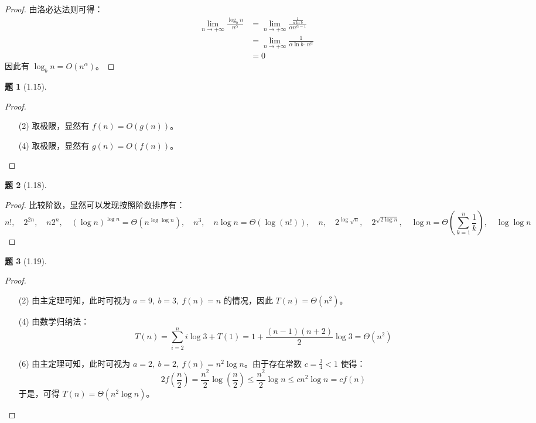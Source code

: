 \documentclass[11pt, a4paper]{article}
\newtheorem{problem}{题}
\begin{document}
\begin{proof}
    由洛必达法则可得：
    \begin{align*}
        \lim_{n \to +\infty} \frac{\log_{b}n}{n^{\alpha}}
         & = \lim_{n \to +\infty} \frac{\frac{1}{n \ln b}}{\alpha n^{\alpha-1}} \\
         & = \lim_{n \to +\infty} \frac{1}{\alpha \ln b \cdot n^{\alpha}}       \\
         & = 0
    \end{align*}
    因此有 $\log_{b}n = O(n^{\alpha})$。
\end{proof}

\vspace{1em}

\begin{problem}[1.15]
\end{problem}

\begin{proof}
    \leavevmode
    \begin{enumerate}
        \item[(2)] 取极限，显然有 $f(n) = O(g(n))$。
        \item[(4)] 取极限，显然有 $g(n) = O(f(n))$。
    \end{enumerate}
\end{proof}

\vspace{1em}

\begin{problem}[1.18]
\end{problem}

\begin{proof}
    比较阶数，显然可以发现按照阶数排序有：
    \[ n!, \quad 2^{2n}, \quad n 2^{n}, \quad (\log n)^{\log n} = \Theta(n^{\log \log n}), \quad n^3, \quad n \log n = \Theta(\log(n!)), \quad n, \quad 2^{\log \sqrt{n}}, \quad 2^{\sqrt{2 \log n}}, \quad \log n = \Theta\left(\sum_{k=1}^{n}\frac{1}{k}\right), \quad \log \log n \]
\end{proof}

\vspace{1em}

\begin{problem}[1.19]
\end{problem}

\begin{proof}
    \leavevmode
    \begin{enumerate}
        \item[(2)] 由主定理可知，此时可视为 $a=9, \ b=3, \ f(n)=n$ 的情况，因此 $T(n) = \Theta(n^2)$。
        \item[(4)] 由数学归纳法：
              \[ T(n) = \sum_{i=2}^{n} i \log 3 + T(1) = 1 + \frac{(n-1)(n+2)}{2} \log 3 = \Theta(n^2) \]
        \item[(6)] 由主定理可知，此时可视为 $a=2, \ b=2, \ f(n)=n^2 \log n$。由于存在常数 $c=\frac{3}{4} < 1$ 使得：
              \[ 2f\left(\frac{n}{2}\right) = \frac{n^2}{2} \log\left(\frac{n}{2}\right) \leq \frac{n^2}{2} \log n \leq cn^2 \log n = cf(n) \]
              于是，可得 $T(n) = \Theta(n^2 \log n)$。
    \end{enumerate}
\end{proof}
\end{document}
